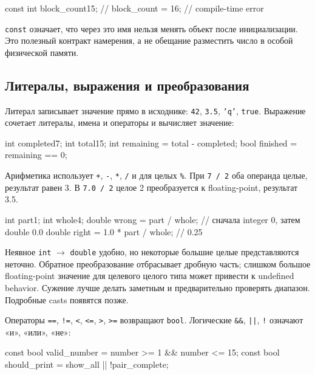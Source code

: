 \begin{cppcode}
const int block_count{15};
// block_count = 16; // compile-time error
\end{cppcode}

\texttt{const} означает, что через это имя нельзя менять объект после
инициализации. Это полезный контракт намерения, а не обещание разместить число
в особой физической памяти.

\subsection{Литералы, выражения и преобразования}

Литерал записывает значение прямо в исходнике: \texttt{42}, \texttt{3.5},
\texttt{'q'}, \texttt{true}. Выражение сочетает литералы, имена и операторы и
вычисляет значение:

\begin{cppcode}
int completed{7};
int total{15};
int remaining = total - completed;
bool finished = remaining == 0;
\end{cppcode}

Арифметика использует \texttt{+}, \texttt{-}, \texttt{*}, \texttt{/} и для
целых \texttt{\%}. При \texttt{7 / 2} оба операнда целые, результат равен 3.
В \texttt{7.0 / 2} целое 2 преобразуется к floating-point, результат 3.5.

\begin{cppcode}
int part{1};
int whole{4};
double wrong = part / whole;       // сначала integer 0, затем double 0.0
double right = 1.0 * part / whole; // 0.25
\end{cppcode}

Неявное \texttt{int} $\rightarrow$ \texttt{double} удобно, но некоторые
большие целые представляются неточно. Обратное преобразование отбрасывает
дробную часть; слишком большое floating-point значение для целевого целого
типа может привести к undefined behavior. Сужение лучше делать заметным и
предварительно проверять диапазон. Подробные casts появятся позже.

Операторы \texttt{==}, \texttt{!=}, \texttt{<}, \texttt{<=}, \texttt{>},
\texttt{>=} возвращают \texttt{bool}. Логические \texttt{\&\&},
\texttt{||}, \texttt{!} означают «и», «или», «не»:

\begin{cppcode}
const bool valid_number = number >= 1 && number <= 15;
const bool should_print = show_all || !pair_complete;
\end{cppcode}

